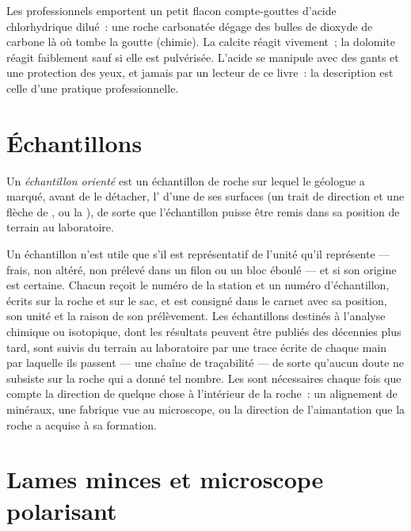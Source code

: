 Les professionnels emportent un petit flacon compte-gouttes d'acide chlorhydrique
dilué~: une roche carbonatée dégage des bulles de dioxyde de carbone là où tombe
la goutte (chimie). La calcite réagit vivement~; la dolomite réagit faiblement
sauf si elle est pulvérisée. L'acide se manipule avec des gants et une protection
des yeux, et jamais par un lecteur de ce livre~: la description est celle d'une
pratique professionnelle.

\section{Échantillons}

\begin{definition}\label{def:b1:field-lab-methods-1:sample}
Un \emph{échantillon orienté} est un échantillon de roche sur lequel le géologue a marqué,
avant de le détacher, l' d'une de ses surfaces (un trait de direction et
une flèche de , ou la ), de sorte que l'échantillon
puisse être remis dans sa position de terrain au laboratoire.
\end{definition}

Un échantillon n'est utile que s'il est représentatif de l'unité qu'il
représente --- frais, non altéré, non prélevé dans un filon ou un bloc
éboulé --- et si son origine est certaine. Chacun reçoit le numéro de la station
et un numéro d'échantillon, écrits sur la roche et sur le sac, et est consigné
dans le carnet avec sa position, son unité et la raison de son prélèvement. Les
échantillons destinés à l'analyse chimique ou isotopique, dont les résultats
peuvent être publiés des décennies plus tard, sont suivis du terrain au
laboratoire par une trace écrite de chaque main par laquelle ils passent --- une
chaîne de traçabilité --- de sorte qu'aucun doute ne subsiste sur la roche qui a
donné tel nombre. Les  sont nécessaires chaque fois que
compte la direction de quelque chose à l'intérieur de la roche~: un alignement
de minéraux, une fabrique vue au microscope, ou la direction de l'aimantation que
la roche a acquise à sa formation.

\section{Lames minces et microscope polarisant}

